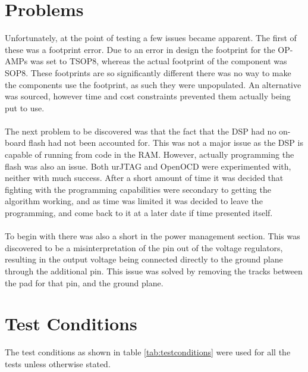 \section{Problems}
\label{ssec:testHWprobs}
Unfortunately, at the point of testing a few issues became apparent.
The first of these was a footprint error.
Due to an error in design the footprint for the OP-AMPs was set to TSOP8, whereas the actual footprint of the component was SOP8.
These footprints are so significantly different there was no way to make the components use the footprint, as such they were unpopulated.
An alternative was sourced, however time and cost constraints prevented them actually being put to use.
\\
\\
The next problem to be discovered was that the fact that the DSP had no on-board flash had not been accounted for.
This was not a major issue as the DSP is capable of running from code in the RAM.
However, actually programming the flash was also an issue.
Both urJTAG and OpenOCD were experimented with, neither with much success.
After a short amount of time it was decided that fighting with the programming capabilities were secondary to getting the algorithm working, and as time was limited it was decided to leave the programming, and come back to it at a later date if time presented itself.
\\
\\
To begin with there was also a short in the power management section.
This was discovered to be a misinterpretation of the pin out of the voltage regulators, resulting in the output voltage being connected directly to the ground plane through the additional pin.
This issue was solved by removing the tracks between the pad for that pin, and the ground plane.

\section{Test Conditions}
The test conditions as shown in table \ref{tab:testconditions} were used for all the tests unless otherwise stated.

